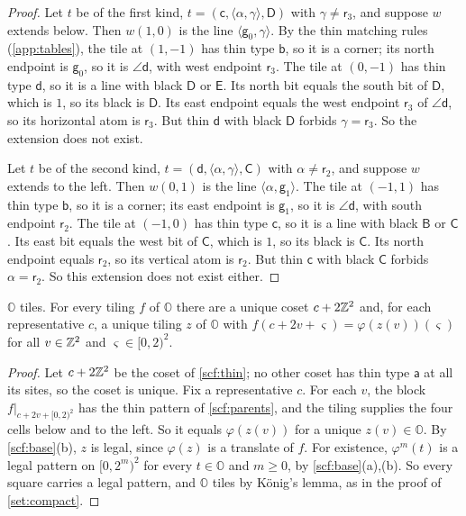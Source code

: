 \begin{proof}
Let $t$ be of the first kind, $t=(\mathsf c,\langle\alpha,\gamma\rangle,\mathsf D)$ with $\gamma\ne\mathsf r_3$, and suppose $w$ extends below. Then $w(1,0)$ is the line $\langle\mathsf g_0,\gamma\rangle$. By the thin matching rules (\cref{app:tables}), the tile at $(1,-1)$ has thin type $\mathsf b$, so it is a corner; its north endpoint is $\mathsf g_0$, so it is $\angle\mathsf d$, with west endpoint $\mathsf r_3$. The tile at $(0,-1)$ has thin type $\mathsf d$, so it is a line with black $\mathsf D$ or $\mathsf E$. Its north bit equals the south bit of $\mathsf D$, which is $1$, so its black is $\mathsf D$. Its east endpoint equals the west endpoint $\mathsf r_3$ of $\angle\mathsf d$, so its horizontal atom is $\mathsf r_3$. But thin $\mathsf d$ with black $\mathsf D$ forbids $\gamma=\mathsf r_3$. So the extension does not exist.

Let $t$ be of the second kind, $t=(\mathsf d,\langle\alpha,\gamma\rangle,\mathsf C)$ with $\alpha\ne\mathsf r_2$, and suppose $w$ extends to the left. Then $w(0,1)$ is the line $\langle\alpha,\mathsf g_1\rangle$. The tile at $(-1,1)$ has thin type $\mathsf b$, so it is a corner; its east endpoint is $\mathsf g_1$, so it is $\angle\mathsf d$, with south endpoint $\mathsf r_2$. The tile at $(-1,0)$ has thin type $\mathsf c$, so it is a line with black $\mathsf B$ or $\mathsf C$. Its east bit equals the west bit of $\mathsf C$, which is $1$, so its black is $\mathsf C$. Its north endpoint equals $\mathsf r_2$, so its vertical atom is $\mathsf r_2$. But thin $\mathsf c$ with black $\mathsf C$ forbids $\alpha=\mathsf r_2$. So this extension does not exist either.
\end{proof}

\begin{proposition}\label{scf:base-desub}
$\mathbb O$ tiles. For every tiling $f$ of $\mathbb O$ there are a unique coset $c+2\mathbb{Z}^2$ and, for each representative $c$, a unique tiling $z$ of $\mathbb O$ with $f(c+2v+\varsigma)=\varphi(z(v))(\varsigma)$ for all $v\in\mathbb{Z}^2$ and $\varsigma\in[0,2)^2$.
\end{proposition}

\begin{proof}
Let $c+2\mathbb{Z}^2$ be the coset of \cref{scf:thin}; no other coset has thin type $\mathsf a$ at all its sites, so the coset is unique. Fix a representative $c$. For each $v$, the block $f|_{c+2v+[0,2)^2}$ has the thin pattern of \cref{scf:parents}, and the tiling supplies the four cells below and to the left. So it equals $\varphi(z(v))$ for a unique $z(v)\in\mathbb O$. By \cref{scf:base}(b), $z$ is legal, since $\varphi(z)$ is a translate of $f$. For existence, $\varphi^m(t)$ is a legal pattern on $[0,2^m)^2$ for every $t\in\mathbb O$ and $m\ge0$, by \cref{scf:base}(a),(b). So every square carries a legal pattern, and $\mathbb O$ tiles by K\"onig's lemma, as in the proof of \cref{set:compact}.
\end{proof}

